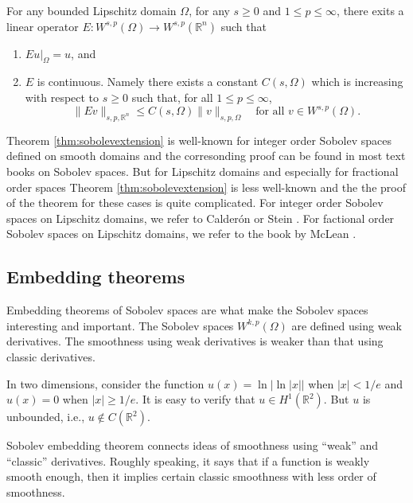 \begin{theorem}\label{thm:sobolevextension}
For any bounded Lipschitz domain $\Omega$, for any $s\geq0$ and $1\leq p \leq \infty$,
there exits a linear operator $E : W^{s,p}(\Omega)\to W^{s,p}(\mathbb R^n)$ such that
\begin{enumerate}
\item $Eu|_{\Omega}= u$, and
\item $E$ is continuous. Namely there exists a constant $C(s, \Omega)$ which is increasing with respect to $s\geq0$ such that, for all $1\leq p \leq \infty$,
\[
\|Ev\|_{s,p,\mathbb R^n}\leq C(s,\Omega)\|v\|_{s,p,\Omega}\quad\textrm{for all }v\in W^{s,p}(\Omega).
\]
\end{enumerate}
\end{theorem}

Theorem \ref{thm:sobolevextension} is well-known for integer order Sobolev spaces defined on smooth domains
and the corresonding proof can be found in most text books on Sobolev spaces. But
for Lipschitz domains and especially for fractional order spaces Theorem \ref{thm:sobolevextension} is less well-known
and the the proof of the theorem for these cases is quite complicated. For integer
order Sobolev spaces on Lipschitz domains, we refer to Calder\'on \cite{Calderon1961} or Stein \cite{Stein1970}. For
factional order Sobolev spaces on Lipschitz domains, we refer to the book by McLean \cite{McLean2000}.


\subsection{Embedding theorems}
Embedding theorems of Sobolev spaces are what make the
Sobolev spaces interesting and important. The Sobolev spaces $W^{k,p}(\Omega)$ are defined using
weak derivatives. The smoothness using weak derivatives is weaker than that using classic
derivatives.

\begin{example}\label{example:20180304-1}
In two dimensions, consider the function $u(x) = \ln|\ln|x||$ when $|x| <1/e$ and $u(x) = 0$ when $|x| \geq 1/e$. It is easy to verify that $u\in H^1(\mathbb R^2)$. But $u$ is unbounded, i.e., $u\notin C(\mathbb R^2)$.
\end{example}

Sobolev embedding theorem connects ideas of smoothness using ``weak'' and ``classic''
derivatives. Roughly speaking, it says that if a function is weakly smooth enough, then it
implies certain classic smoothness with less order of smoothness.

